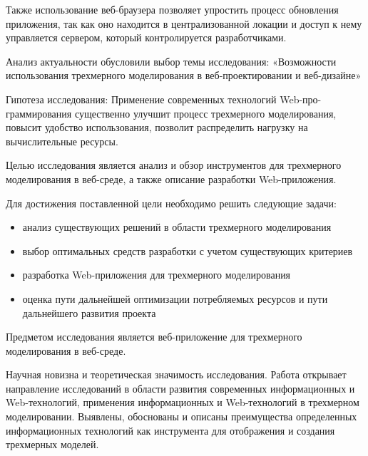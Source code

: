 Также использование веб-браузера позволяет упростить процесс обновления приложения, так как оно 
находится в централизованной локации и доступ к нему управляется сервером, который контролируется разработчиками.

Анализ актуальности обусловили выбор темы исследования: «Возможности использования трехмерного моделирования в веб-проектировании и веб-дизайне»

Гипотеза исследования: Применение современных технологий Web-про-граммирования существенно улучшит процесс трехмерного моделирования, повысит удобство использования, позволит распределить 
нагрузку на вычислительные ресурсы.

Целью исследования является анализ и обзор инструментов для трехмерного моделирования в веб-среде, а также описание разработки Web-приложения.

Для достижения поставленной цели необходимо решить следующие задачи:  
\begin{itemize}
\item анализ существующих решений в области трехмерного моделирования
\item выбор оптимальных средств разработки с учетом существующих критериев  
\item разработка Web-приложения для трехмерного моделирования  
\item оценка пути дальнейшей оптимизации потребляемых ресурсов и пути дальнейшего развития проекта
\end{itemize}

Предметом исследования является веб-приложение для трехмерного моделирования в веб-среде.

Научная новизна и теоретическая значимость исследования. Работа открывает направление исследований в области развития современных информационных и Web-технологий, применения информационных 
и Web-технологий в трехмерном моделировании. Выявлены, обоснованы и описаны преимущества определенных информационных технологий как инструмента 
для отображения и создания трехмерных моделей. 

